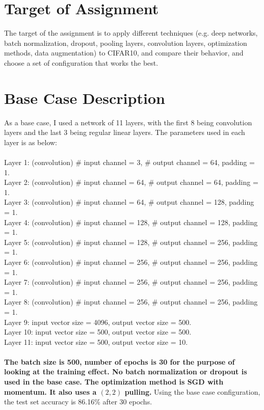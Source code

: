 

\oddsidemargin 0in
\evensidemargin 0in
\textwidth 6.5in
\topmargin -0.5in
\textheight 9.0in
\usepackage{amsmath}





\pagestyle{myheadings}  %

\section{Target of Assignment}

The target of the assignment is to apply different techniques (e.g. deep networks, batch normalization, dropout, pooling layers, convolution layers, optimization methods, data augmentation) to CIFAR10, and compare their behavior, and choose a set of configuration that works the best. 

\section{Base Case Description}
As a base case, I used a network of 11 layers, with the first 8 being convolution layers and the last 3 being regular linear layers. The parameters used in each layer is as below:\\  \\
Layer 1: (convolution) \# input channel = 3, \# output channel = 64,  padding = 1.\\
Layer 2: (convolution) \# input channel = 64, \# output channel = 64,  padding = 1.\\
Layer 3: (convolution) \# input channel = 64, \# output channel = 128,  padding = 1.\\
Layer 4: (convolution) \# input channel = 128, \# output channel = 128,  padding = 1.\\
Layer 5: (convolution) \# input channel = 128, \# output channel = 256,  padding = 1.\\
Layer 6: (convolution) \# input channel = 256, \# output channel = 256,  padding = 1.\\
Layer 7: (convolution) \# input channel = 256, \# output channel = 256,  padding = 1.\\
Layer 8: (convolution) \# input channel = 256, \# output channel = 256,  padding = 1.\\
Layer 9: input vector size = 4096, output vector size = 500.\\
Layer 10: input vector size = 500, output vector size = 500.\\
Layer 11: input vector size = 500, output vector size = 10.\\ 
\\
\textbf{The batch size is 500, number of epochs is 30 for the purpose of looking at the training effect. No batch normalization or dropout is used in the base case. The optimization method is SGD with momentum. It also uses a $(2,2)$ pulling.} Using the base case configuration, the test set accuracy is 86.16\% after 30 epochs.

